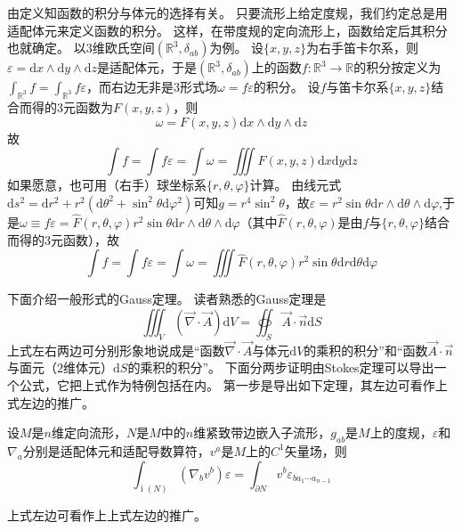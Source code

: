 由定义知函数的积分与体元的选择有关。
只要流形上给定度规，我们约定总是用适配体元来定义函数的积分。
这样，在带度规的定向流形上，函数给定后其积分也就确定。
以$3$维欧氏空间$(\mathbb{R}^3, \delta_{ab})$为例。
设$\{x, y, z\}$为右手笛卡尔系，则$\varepsilon = \mathrm{d}x \wedge \mathrm{d}y \wedge \mathrm{d}z$是适配体元，于是$(\mathbb{R}^3, \delta_{ab})$上的函数$f \colon \mathbb{R}^3 \to \mathbb{R}$的积分按定义为$\displaystyle\int_{\mathbb{R}^3}f = \int_{\mathbb{R}^3}f\varepsilon$，而右边无非是$3$形式场$\omega = f\varepsilon$的积分。
设$f$与笛卡尔系$\{x, y, z\}$结合而得的$3$元函数为$F(x, y, z)$，则
$$\omega = F(x, y, z)\mathrm{d}x\wedge\mathrm{d}y\wedge\mathrm{d}z$$
故
$$\int f = \int f\varepsilon = \int \omega = \iiint F(x, y, z) \mathrm{d}x\mathrm{d}y\mathrm{d}z$$
如果愿意，也可用（右手）球坐标系$\{r, \theta, \varphi\}$计算。
由线元式$\mathrm{d}s^2 = \mathrm{d}r^2 + r^2(\mathrm{d}\theta^2 + \sin^2\theta\mathrm{d}\varphi^2)$可知$g = r^4\sin^2\theta$，故$\varepsilon = r^2\sin\theta\mathrm{d}r\wedge\mathrm{d}\theta\wedge\mathrm{d}\varphi$,于是$\omega \equiv f\varepsilon = \hat{F}(r, \theta, \varphi)r^2\sin\theta\mathrm{d}r \wedge\mathrm{d}\theta\wedge\mathrm{d}\varphi$（其中$\hat{F}(r, \theta, \varphi)$是由$f$与$\{r, \theta, \varphi\}$结合而得的$3$元函数），故
$$\int f = \int f\varepsilon = \int\omega = \iiint\hat{F}(r, \theta, \varphi)r^2\sin\theta\mathrm{d}r\mathrm{d}\theta\mathrm{d}\varphi$$

下面介绍一般形式的Gauss定理。
读者熟悉的Gauss定理是
$$\iiint_V (\vec{\nabla}\cdot\vec{A})\mathrm{d}V = \oiint_S\vec{A}\cdot\vec{n}\mathrm{d}S$$
上式左右两边可分别形象地说成是``函数$\vec\nabla \cdot \vec A$与体元$\mathrm{d}V$的乘积的积分''和``函数$\vec A \cdot \vec n$与面元（$2$维体元）$\mathrm{d}S$的乘积的积分''。
下面分两步证明由Stokes定理可以导出一个公式，它把上式作为特例包括在内。
第一步是导出如下定理，其左边可看作上式左边的推广。

\begin{theorem}
    设$M$是$n$维定向流形，$N$是$M$中的$n$维紧致带边嵌入子流形，$g_{ab}$是$M$上的度规，$\varepsilon$和$\nabla_a$分别是适配体元和适配导数算符，$v^a$是$M$上的$C^1$矢量场，则
    $$\int_{\operatorname{i}(N)}(\nabla_bv^b)\varepsilon = \int_{\partial N}v^b\varepsilon_{b a_1 \cdots a_{n - 1}}$$
\end{theorem}

\begin{note}
    上式左边可看作上上式左边的推广。
\end{note}

